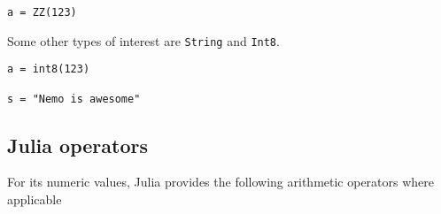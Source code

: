 \documentclass[a4paper,10pt]{article}
\newcommand{\code}{\lstinline}
\begin{document}
\begin{lstlisting}
a = ZZ(123)
\end{lstlisting}

Some other types of interest are \code{String} and \code{Int8}.

\begin{lstlisting}
a = int8(123)

s = "Nemo is awesome"
\end{lstlisting}

\subsection{Julia operators}

For its numeric values, Julia provides the following arithmetic operators where applicable
\end{document}

